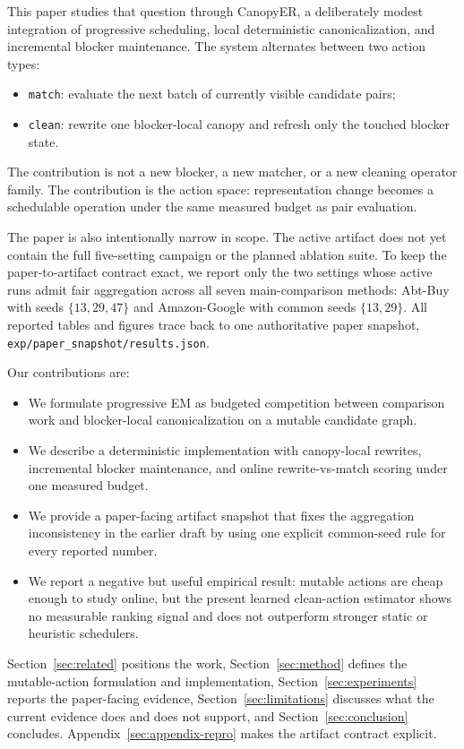 \documentclass{article}
\newcommand{\method}{CanopyER}
\newcommand{\matcha}{\texttt{match}}
\newcommand{\cleana}{\texttt{clean}}
\begin{document}
This paper studies that question through \method{}, a deliberately modest integration of progressive scheduling, local deterministic canonicalization, and incremental blocker maintenance. The system alternates between two action types:
\begin{itemize}
  \item \matcha{}: evaluate the next batch of currently visible candidate pairs;
  \item \cleana{}: rewrite one blocker-local canopy and refresh only the touched blocker state.
\end{itemize}
The contribution is not a new blocker, a new matcher, or a new cleaning operator family. The contribution is the action space: representation change becomes a schedulable operation under the same measured budget as pair evaluation.

The paper is also intentionally narrow in scope. The active artifact does not yet contain the full five-setting campaign or the planned ablation suite. To keep the paper-to-artifact contract exact, we report only the two settings whose active runs admit fair aggregation across all seven main-comparison methods: Abt-Buy with seeds $\{13,29,47\}$ and Amazon-Google with common seeds $\{13,29\}$. All reported tables and figures trace back to one authoritative paper snapshot, \texttt{exp/paper\_snapshot/results.json}.

Our contributions are:
\begin{itemize}
  \item We formulate progressive EM as budgeted competition between comparison work and blocker-local canonicalization on a mutable candidate graph.
  \item We describe a deterministic implementation with canopy-local rewrites, incremental blocker maintenance, and online rewrite-vs-match scoring under one measured budget.
  \item We provide a paper-facing artifact snapshot that fixes the aggregation inconsistency in the earlier draft by using one explicit common-seed rule for every reported number.
  \item We report a negative but useful empirical result: mutable actions are cheap enough to study online, but the present learned clean-action estimator shows no measurable ranking signal and does not outperform stronger static or heuristic schedulers.
\end{itemize}

Section~\ref{sec:related} positions the work, Section~\ref{sec:method} defines the mutable-action formulation and implementation, Section~\ref{sec:experiments} reports the paper-facing evidence, Section~\ref{sec:limitations} discusses what the current evidence does and does not support, and Section~\ref{sec:conclusion} concludes. Appendix~\ref{sec:appendix-repro} makes the artifact contract explicit.
\end{document}
